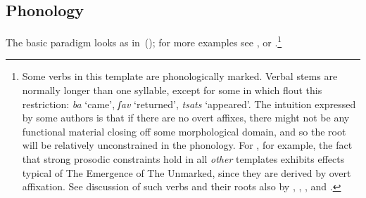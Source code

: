 {		\subsection{Phonology} \label{voice:voice:phono}
The basic paradigm looks as in~(\nextx); for more examples see \cite{schwarzwald08}, \cite{faust12} or \cite{kastner18nllt}.\footnote{Some verbs in this template are phonologically marked. Verbal stems are normally longer than one syllable, except for some in {\tkal} which flout this restriction:
\ex \emph{ba} `came', \emph{ʃav} `returned', \emph{tsats} `appeared'.
\xe
\label{r1:2:1}The intuition expressed by some authors is that if there are no overt affixes, there might not be any functional material closing off some morphological domain, and so the root will be relatively unconstrained in the phonology. For \cite{ussishkin05}, for example, the fact that strong prosodic constraints hold in all \emph{other} templates exhibits effects typical of The Emergence of The Unmarked, since they are derived by overt affixation. See discussion of such verbs and their roots also by \cite{laks11}, \cite{borer13oup}, \cite{borer15roots}, \cite{tucker15roots} and \cite{kastner18nllt}.}

\ex
{}
\xe

}
